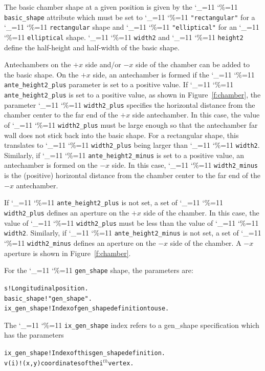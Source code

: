 \documentclass[11pt]{article}
\newcommand\ttcmd{\begingroup\catcode`\_=11 \catcode`\%=11 \dottcmd}
\newcommand\dottcmd[1]{\texttt{#1}\endgroup}
\newcommand{\fig}[1]{Figure~\ref{#1}}
\newcommand{\vn}{\ttcmd}
\newcommand{\Th}{$^{th}$\xspace}
\newlength{\ExBeg}
\newlength{\ExEnd}
\newenvironment{example}
  {\vspace{\ExBeg} \begin{alltt}}
  {\end{alltt} \vspace{\ExEnd}}
\begin{document}
The basic chamber shape at a given position is given by the
\vn{basic_shape} attribute which must be set to 
\vn{"rectangular"} for a \vn{rectangular} shape and \vn{"elliptical"}
for an \vn{elliptical} shape. \vn{width2} and \vn{height2}
define the half-height and half-width of the basic shape.

Antechambers on the $+x$ side and/or $-x$ side of the chamber can be
added to the basic shape. On the $+x$ side, an antechamber is formed
if the \vn{ante_height2_plus} parameter is set to a positive value. If
\vn{ante_height2_plus} is set to a positive value, as shown in
\fig{f:chamber}, the parameter \vn{width2_plus} specifies the
horizontal distance from the chamber center to the far end of the $+x$
side antechamber. In this case, the value of \vn{width2_plus} must be
large enough so that the antechamber far wall does not stick back into
the basic shape. For a rectangular shape, this translates to
\vn{width2_plus} being larger than \vn{width2}. Similarly, if
\vn{ante_height2_minus} is set to a positive value, an antechamber is
formed on the $-x$ side.  In this case, \vn{width2_minus} is the
(positive) horizontal distance from the chamber center to the far end
of the $-x$ antechamber.

If \vn{ante_height2_plus} is not set, a set of \vn{width2_plus}
defines an aperture on the $+x$ side of the chamber. In this case, the
value of \vn{width2_plus} must be less than the value of
\vn{width2}. Similarly, if \vn{ante_height2_minus} is not set, a set of
\vn{width2_minus} defines an aperture on the $-x$ side of the chamber.
A $-x$ aperture is shown in \fig{f:chamber}.

For the \vn{gen_shape} shape, the parameters are:
\begin{example}
  s                   ! Longitudinal position.
  basic_shape         ! "gen_shape".
  ix_gen_shape        ! Index of gen_shape definition to use.
\end{example}
The \vn{ix_gen_shape} index refers to a gen_shape
specification which has the parameters
\begin{example}
  ix_gen_shape        ! Index of this gen_shape definition.
  v(i)                ! (x, y) coordinates of the i\Th vertex.
\end{example}
\end{document}
